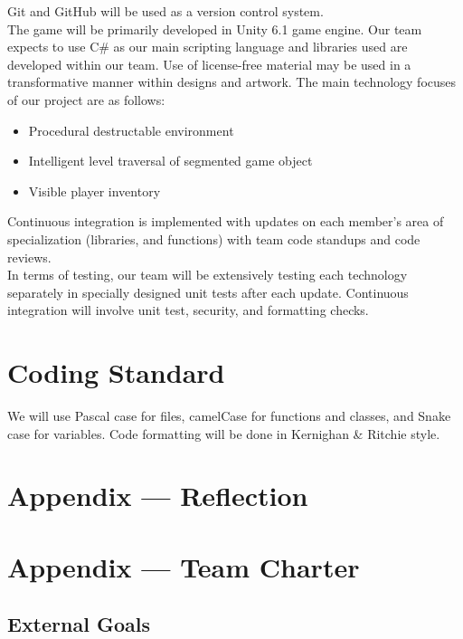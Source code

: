 \documentclass{article}
\begin{document}
Git and GitHub will be used as a version control system.\\

The game will be primarily developed in Unity 6.1 game engine. Our team expects to use C\# as our main scripting language and libraries used are developed within our team. Use of license-free material may be used in a transformative manner within designs and artwork. The main technology focuses of our project are as follows:
\begin{itemize}
\item{Procedural destructable environment}
\item{Intelligent level traversal of segmented game object}
\item{Visible player inventory}
\end{itemize}

Continuous integration is implemented with updates on each member’s area of specialization (libraries, and functions) with team code standups and code reviews.\\

In terms of testing, our team will be extensively testing each technology separately in specially designed unit tests after each update. Continuous integration will involve unit test, security, and formatting checks.


\section{Coding Standard}

We will use Pascal case for files, camelCase for functions and classes, and Snake case for variables. Code formatting will be done in Kernighan \& Ritchie style.

\newpage{}

\section*{Appendix --- Reflection}



\newpage{}

\section*{Appendix --- Team Charter}

\subsection*{External Goals}
\end{document}
